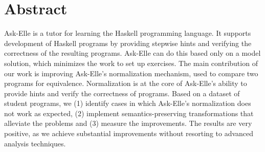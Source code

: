 \begingroup
\let\clearpage\relax
\let\cleardoublepage\relax
\let\cleardoublepage\relax

\chapter*{Abstract}

Ask-Elle is a tutor for learning the Haskell programming language. It supports development of Haskell programs by providing stepwise hints and verifying the correctness of the resulting programs. Ask-Elle can do this based only on a model solution, which minimizes the work to set up exercises. The main contribution of our work is improving Ask-Elle's normalization mechanism, used to compare two programs for equivalence. Normalization is at the core of Ask-Elle's ability to provide hints and verify the correctness of programs. Based on a dataset of student programs, we (1) identify cases in which Ask-Elle's normalization does not work as expected, (2) implement semantics-preserving transformations that alleviate the problems and (3) measure the improvements. The results are very positive, as we achieve substantial improvements without resorting to advanced analysis techniques.

\endgroup

\vfill